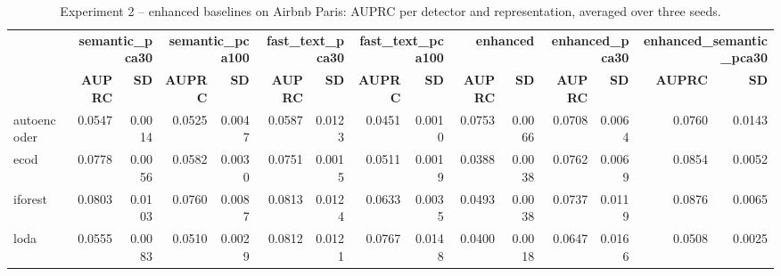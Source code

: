 \begin{table}
\centering
\caption{Experiment 2 -- enhanced baselines on Airbnb Paris: AUPRC per detector and representation, averaged over three seeds.}
\label{tab:exp2_airbnb_paris}
\begin{tabular}{lrrrrrrrrrrrrrr}
\toprule
 & \multicolumn{2}{r}{\bfseries semantic\_pca30} & \multicolumn{2}{r}{\bfseries semantic\_pca100} & \multicolumn{2}{r}{\bfseries fast\_text\_pca30} & \multicolumn{2}{r}{\bfseries fast\_text\_pca100} & \multicolumn{2}{r}{\bfseries enhanced} & \multicolumn{2}{r}{\bfseries enhanced\_pca30} & \multicolumn{2}{r}{\bfseries enhanced\_semantic\_pca30} \\
 & \bfseries AUPRC & \bfseries SD & \bfseries AUPRC & \bfseries SD & \bfseries AUPRC & \bfseries SD & \bfseries AUPRC & \bfseries SD & \bfseries AUPRC & \bfseries SD & \bfseries AUPRC & \bfseries SD & \bfseries AUPRC & \bfseries SD \\
\midrule
autoencoder & 0.0547 & 0.0014 & 0.0525 & 0.0047 & 0.0587 & 0.0123 & 0.0451 & 0.0010 & 0.0753 & 0.0066 & 0.0708 & 0.0064 & 0.0760 & 0.0143 \\
ecod & 0.0778 & 0.0056 & 0.0582 & 0.0030 & 0.0751 & 0.0015 & 0.0511 & 0.0019 & 0.0388 & 0.0038 & 0.0762 & 0.0069 & 0.0854 & 0.0052 \\
iforest & 0.0803 & 0.0103 & 0.0760 & 0.0087 & 0.0813 & 0.0124 & 0.0633 & 0.0035 & 0.0493 & 0.0038 & 0.0737 & 0.0119 & 0.0876 & 0.0065 \\
loda & 0.0555 & 0.0083 & 0.0510 & 0.0029 & 0.0812 & 0.0121 & 0.0767 & 0.0148 & 0.0400 & 0.0018 & 0.0647 & 0.0166 & 0.0508 & 0.0025 \\
\bottomrule
\end{tabular}
\end{table}
